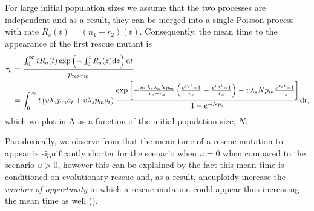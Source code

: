 \documentclass[12pt]{extarticle}
\renewcommand{\d}[1]{\ensuremath{\operatorname{d}\!{#1}}}
\renewcommand{\d}{{\rm d}}
\newcommand{\e}{e}
\newcommand{\presc}{p_\text{rescue}}
\renewcommand{\Delta}{r}
\begin{document}
\begin{appendices}
For large initial population sizes we assume that the two processes are independent and as a result, they can be merged into a single Poisson process with rate $R_a(t)=\left(n_1+r_2\right)\left(t\right)$.
Consequently, the mean time to the appearance of the first rescue mutant is
\begin{align}\nonumber
\tau_a &= \frac{\int_{0}^{\infty}{tR_a(t)\exp\left(-\int_0^{t}{R_a(z)\d z}\right) \d t}}{\presc}\\ \label{meantimet2}
&=
\int_0^\infty t\left(v\lambda_ap_ma_t+v\lambda_sp_ms_t\right)\frac{\exp\left[-\frac{uv\lambda_s\lambda_aNp_m}{\Delta_s-\Delta_a}\left(\frac{\e^{\Delta_s t}-1}{\Delta_s}-\frac{\e^{\Delta_a t}-1}{\Delta_a}\right)-v\lambda_sNp_m\frac{\e^{\Delta_s t}-1}{\Delta_s}\right] }{1-\e^{-Np_s}}\d t,
\end{align}
which we plot in A as a function of the initial population size, $N$.

Paradoxically, we observe from  that the mean time of a rescue mutation to appear is significantly shorter for the scenario when $u=0$ when compared to the scenario $u>0$, however this can be explained by the fact this mean time is conditioned on evolutionary rescue and, as a result, aneuploidy increase the \emph{window of opportunity} in which a rescue mutation could appear thus increasing the mean time as well ().


\end{appendices}
\end{document}

